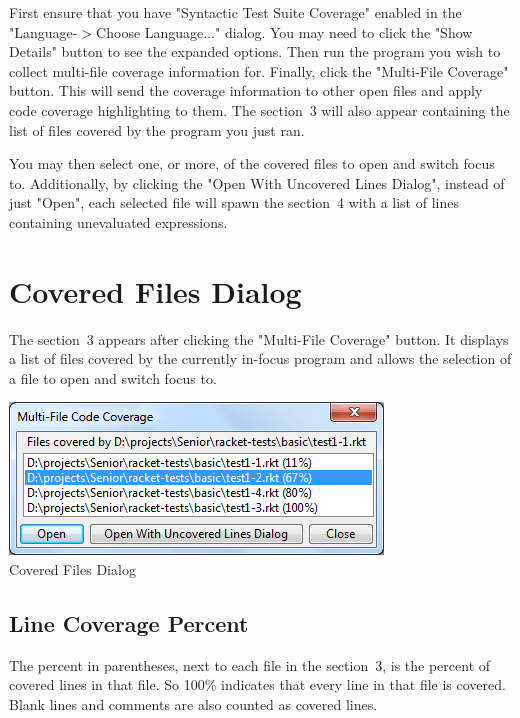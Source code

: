 \documentclass{article}
\newcommand{\sectionNewpage}{}
\newcommand{\ChapRef}[2]{\SecRef{#1}{#2}}
\newcommand{\SecRef}[2]{section~#1}
\newenvironment{SCentered}{\begin{trivlist}\item \centering}{\end{trivlist}}
\begin{document}
First ensure that you have "Syntactic Test Suite Coverage" enabled in the "Language{-}$>$Choose Language..." dialog. You may need to click the "Show Details" button to see the expanded options. Then run the program you wish to collect multi{-}file coverage information for. Finally, click the "Multi{-}File Coverage" button. This will send the coverage information to other open files and apply code coverage highlighting to them. The \ChapRef{3}{Covered Files Dialog} will also appear containing the list of files covered by the program you just ran.

You may then select one, or more, of the covered files to open and switch focus to. Additionally, by clicking the "Open With Uncovered Lines Dialog", instead of just "Open", each selected file will spawn the \ChapRef{4}{Uncovered Lines Dialog} with a list of lines containing unevaluated expressions.

\sectionNewpage

\section[Covered Files Dialog]{Covered Files Dialog}\label{t:x28part_x22Covered_Files_Dialogx22x29}

The \ChapRef{3}{Covered Files Dialog} appears after clicking the "Multi{-}File Coverage" button. It displays a list of files covered by the currently in{-}focus program and allows the selection of a file to open and switch focus to.

\begin{SCentered}\includegraphics[scale=1.0]{covered-files-dialog.png}
\\
Covered Files Dialog\end{SCentered}

\subsection[Line Coverage Percent]{Line Coverage Percent}\label{t:x28part_x22Linex5fCoveragex5fPercentx22x29}

The percent in parentheses, next to each file in the \ChapRef{3}{Covered Files Dialog}, is the percent of covered lines in that file. So 100\% indicates that every line in that file is covered. Blank lines and comments are also counted as covered lines.
\end{document}
